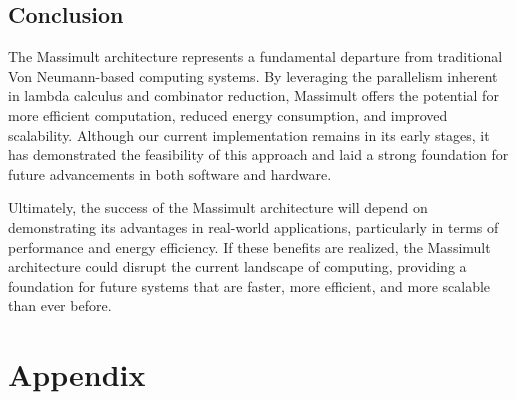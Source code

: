 \documentclass{IEEEtran}
\begin{document}
\subsection{Conclusion}
\par The Massimult architecture represents a fundamental departure from traditional Von Neumann-based computing systems. By leveraging the parallelism inherent in lambda calculus and combinator reduction, Massimult offers the potential for more efficient computation, reduced energy consumption, and improved scalability. Although our current implementation remains in its early stages, it has demonstrated the feasibility of this approach and laid a strong foundation for future advancements in both software and hardware.

\par Ultimately, the success of the Massimult architecture will depend on demonstrating its advantages in real-world applications, particularly in terms of performance and energy efficiency. If these benefits are realized, the Massimult architecture could disrupt the current landscape of computing, providing a foundation for future systems that are faster, more efficient, and more scalable than ever before.


\section{Appendix}

\end{document}

